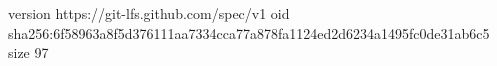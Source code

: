 version https://git-lfs.github.com/spec/v1
oid sha256:6f58963a8f5d376111aa7334cca77a878fa1124ed2d6234a1495fc0de31ab6c5
size 97
